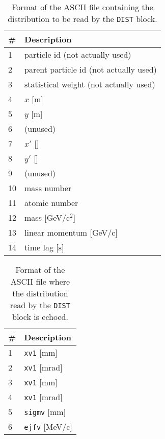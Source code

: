 \begin{minipage}[t]{0.45\textwidth}
  \begin{center}
    \begin{longtable}{|l|l|}%
      \caption{Format of the ASCII file containing the distribution to be read by the \texttt{DIST} block.}
      \label{tab:distReadFileColumns} \\*
      \hline
      \rowcolor{blue!30}
      \# & Description \\*
      \hline
      \endfirsthead
      1  & particle id (not actually used) \\*
      2  & parent particle id (not actually used) \\*
      3  & statistical weight (not actually used) \\*
      4  & $x$ [m] \\*
      5  & $y$ [m] \\*
      6  & (unused) \\*
      7  & $x'$ [] \\*
      8  & $y'$ [] \\*
      9  & (unused) \\*
      10 & mass number \\*
      11 & atomic number \\*
      12 & mass [GeV/c$^2$] \\*
      13 & linear momentum [GeV/c] \\*
      14 & time lag [s] \\*
      \hline
    \end{longtable}
  \end{center}
\end{minipage}
\hfill
\begin{minipage}[t]{0.45\textwidth}
  \begin{center}
    \begin{longtable}{|l|l|}%
      \caption{Format of the ASCII file where the distribution read by the \texttt{DIST} block is echoed.}
      \label{tab:distEchoFileColumns} \\*
      \hline
      \rowcolor{blue!30}
      \# & Description \\*
      \hline
      \endfirsthead
      1  & \texttt{xv1} [mm]   \\*
      2  & \texttt{xv1} [mrad] \\*
      3  & \texttt{xv1} [mm]   \\*
      4  & \texttt{xv1} [mrad] \\*
      5  & \texttt{sigmv} [mm] \\*
      6  & \texttt{ejfv} [MeV/c] \\*
      \hline
    \end{longtable}
  \end{center}
\end{minipage}

